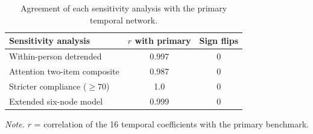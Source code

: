 \begin{table}[H]
\raggedright
\caption{Agreement of each sensitivity analysis with the primary temporal network.}
\label{tab:agreement}
\footnotesize
\begingroup
\setlength{\tabcolsep}{4pt}
\renewcommand{\arraystretch}{1.08}
\noindent
\begin{tabular*}{\textwidth}{@{\extracolsep{\fill}}lcc@{}}
\toprule
Sensitivity analysis & $r$ with primary & Sign flips \\
\midrule
Within-person detrended & 0.997 & 0 \\
Attention two-item composite & 0.987 & 0 \\
Stricter compliance ($\geq 70$) & 1.0 & 0 \\
Extended six-node model & 0.999 & 0 \\
\bottomrule
\end{tabular*}
\par\vspace{3pt}\noindent\parbox{\textwidth}{\footnotesize\textit{Note.} $r$ = correlation of the 16 temporal coefficients with the primary benchmark.}
\endgroup
\end{table}
